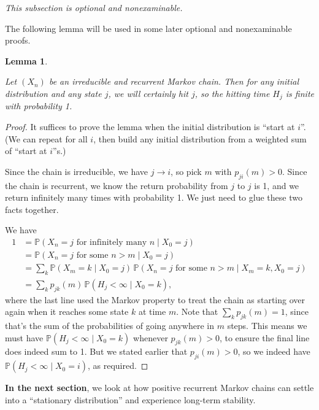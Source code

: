 \documentclass[
  a4paper,
]{article}
\newtheorem{lemma}{Lemma}[section]
\theoremstyle{definition}
\theoremstyle{definition}
\theoremstyle{definition}
\theoremstyle{remark}
\begin{document}
\emph{This subsection is optional and nonexaminable.}

The following lemma will be used in some later optional and nonexaminable proofs.

\begin{lemma}
\protect\hypertarget{lem:lemma}{}\label{lem:lemma}

Let \((X_n)\) be an irreducible and recurrent Markov chain. Then for any initial distribution and any state \(j\), we will certainly hit \(j\), so the hitting time \(H_j\) is finite with probability 1.

\end{lemma}

\begin{proof}

It suffices to prove the lemma when the initial distribution is ``start at \(i\)''. (We can repeat for all \(i\), then build any initial distribution from a weighted sum of ``start at \(i\)''s.)

Since the chain is irreducible, we have \(j \to i\), so pick \(m\) with \(p_{ji}(m) > 0\). Since the chain is recurrent, we know the return probability from \(j\) to \(j\) is 1, and we return infinitely many times with probability 1. We just need to glue these two facts together.

We have
\begin{align*}
1 &= \mathbb P(X_n = j \text{ for infinitely many $n$} \mid X_0 = j) \\
&= \mathbb P(X_n = j \text{ for some $n > m$} \mid X_0 = j) \\
&= \sum_k \mathbb P(X_m = k \mid X_0 = j) \,\mathbb P(X_n = j \text{ for some $n > m$} \mid X_m = k, X_0 = j) \\
&= \sum_k p_{jk}(m) \,\mathbb P(H_j < \infty \mid X_0 = k) ,
\end{align*}
where the last line used the Markov property to treat the chain as starting over again when it reaches some state \(k\) at time \(m\). Note that \(\sum_k p_{jk}(m) = 1\), since that's the sum of the probabilities of going anywhere in \(m\) steps. This means we must have \(\mathbb P(H_j < \infty \mid X_0 = k)\) whenever \(p_{jk}(m) > 0\), to ensure the final line does indeed sum to 1. But we stated earlier that \(p_{ji}(m) > 0\), so we indeed have \(\mathbb P(H_j < \infty \mid X_0 = i)\), as required.

\end{proof}

\textbf{In the next section}, we look at how positive recurrent Markov chains can settle into a ``stationary distribution'' and experience long-term stability.
\end{document}
